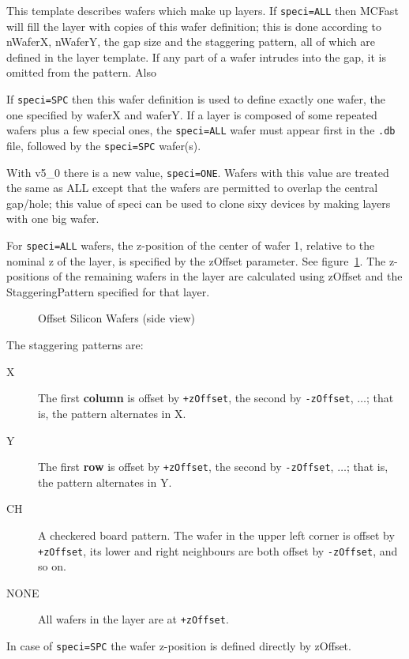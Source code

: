 This template describes wafers which make up layers.
If {\tt speci=ALL} then MCFast will fill the layer with copies
of this wafer definition; this is done according to nWaferX, nWaferY,
the gap size and the staggering pattern, all of which 
are defined in the layer template.  If any part of a wafer intrudes
into the gap, it is omitted from the pattern.  Also

If {\tt speci=SPC} then this wafer definition is used to define 
exactly one wafer, the one specified by waferX and waferY.
If a layer is composed of some repeated wafers 
plus a few special ones, the {\tt speci=ALL} wafer must appear 
first in the {\tt .db} file, followed by the {\tt speci=SPC} wafer(s).

With v5\_0 there is a new value, {\tt speci=ONE}.
Wafers with this value are treated the same as ALL 
except that the wafers are permitted to overlap the central gap/hole; 
this value of speci can be used to clone sixy devices by making layers
with one big wafer.

For {\tt speci=ALL} wafers, the z-position of the center of wafer 1, 
relative to the nominal z of the layer, is specified by the 
zOffset parameter.  See figure~\ref{siz2}.  The
z-positions of the remaining wafers in the layer are calculated 
using zOffset and the StaggeringPattern specified for that layer.
%
\begin{figure} [htb]
\begin{center}
\centerline{\epsfysize=3.0in }
\caption{\label{siz2} Offset Silicon Wafers (side view)}
\end{center}
\end{figure}
%
The staggering patterns are:
%
\begin{description}
   \item[X] The first {\bf column} is offset by {\tt +zOffset}, the second
             by {\tt -zOffset}, $\dots$; that is, the pattern alternates 
             in X.
   \item[Y] The first {\bf row} is offset by {\tt +zOffset}, the second
             by {\tt -zOffset}, $\dots$; that is, the pattern
             alternates in Y.
   \item[CH] A checkered board pattern.  The wafer in the upper left
             corner is offset by {\tt +zOffset}, its lower and right
             neighbours are both offset by {\tt -zOffset}, and so on.
   \item[NONE] All wafers in the layer are at {\tt +zOffset}.
\end{description}
%
In case of {\tt speci=SPC} the wafer z-position is defined directly by 
zOffset.


